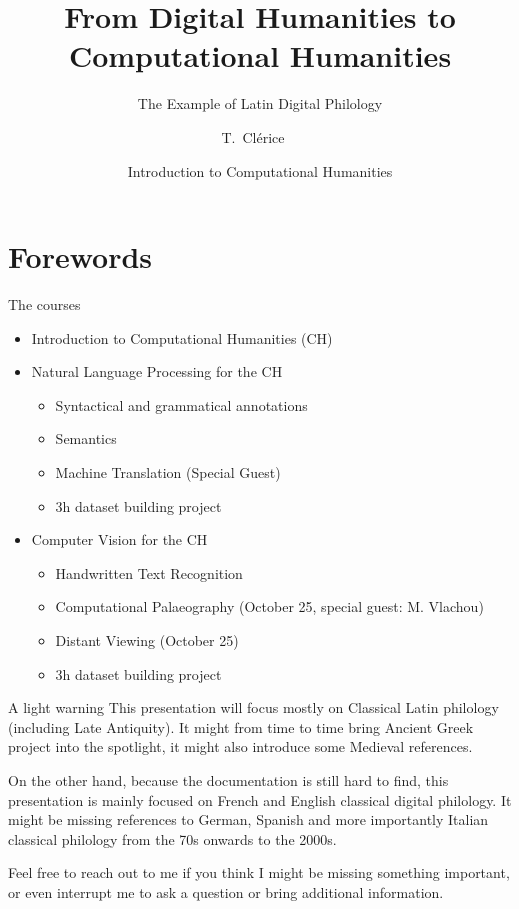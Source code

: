 \documentclass[aspectratio=169]{beamer}
\title[Intro to CH] %
{From Digital Humanities to Computational Humanities}\subtitle{The Example of Latin Digital Philology}
\author[Clérice, Thibault] %
{T.~Clérice~\inst{1}~\inst{2}}
\institute[Inria] %
{
  \inst{1}%
  ALMAnaCH, Inria, Paris, France \and
  \inst{2}%
  FeDHLab, Università Federico II, Napoli, Italia
 }
\date[2024] %
{Introduction to Computational Humanities}
\begin{document}
\frame{\titlepage}


\section{Forewords}

\begin{frame}{The courses}
    \begin{itemize}
        \item Introduction to Computational Humanities (CH)
        \item Natural Language Processing for the CH
        \begin{itemize}
            \item Syntactical and grammatical annotations
            \item Semantics
            \item Machine Translation (Special Guest)
            \item 3h dataset building project
        \end{itemize}
        \item Computer Vision for the CH
        \begin{itemize}
            \item Handwritten Text Recognition
            \item Computational Palaeography (October 25, special guest: M. Vlachou)
            \item Distant Viewing (October 25)
            \item 3h dataset building project
        \end{itemize}
    \end{itemize}
\end{frame}

\begin{frame}{A light warning}
    This presentation will focus mostly on Classical Latin philology (including Late Antiquity). It might from time to time bring Ancient Greek project into the spotlight, it might also introduce some Medieval references.

    On the other hand, because the documentation is still hard to find, this presentation is mainly focused on French and English classical digital philology. It might be missing references to German, Spanish and more importantly Italian classical philology from the 70s onwards to the 2000s. 
    
    Feel free to reach out to me if you think I might be missing something important, or even interrupt me to ask a question or bring additional information.
\end{frame}
\end{document}
